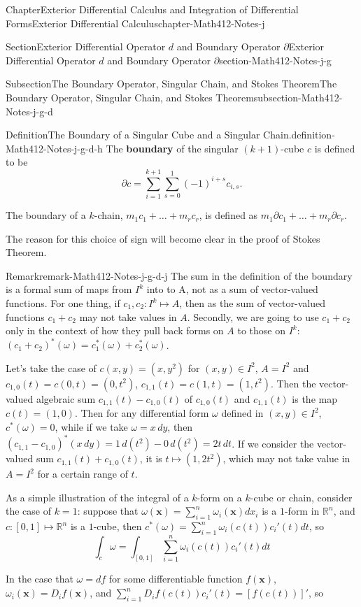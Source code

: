\documentclass[oneside,10pt,]{book}
\newcommand{\terminology}[1]{\textbf{#1}}
\numberwithin{equation}{section}
\newcommand{\bx}{\mathbf{x}}
\newcommand{\bbR}{\mathbb{R}}
\begin{document}
\begin{chapterptx}{Chapter}{Exterior Differential Calculus and Integration of Differential Forms}{}{Exterior Differential Calculus}{}{}{chapter-Math412-Notes-j}
\begin{sectionptx}{Section}{Exterior Differential Operator \(d\) and Boundary Operator \(\partial\)}{}{Exterior Differential Operator \(d\) and Boundary Operator \(\partial\)}{}{}{section-Math412-Notes-j-g}
\begin{subsectionptx}{Subsection}{The Boundary Operator, Singular Chain, and Stokes Theorem}{}{The Boundary Operator, Singular Chain, and Stokes Theorem}{}{}{subsection-Math412-Notes-j-g-d}
\begin{definition}{Definition}{The Boundary of a Singular Cube and a Singular Chain.}{definition-Math412-Notes-j-g-d-h}
The \terminology{boundary} of the singular \((k+1)\)-cube  \(c\) is defined to be%
\begin{equation*}
\partial c=\sum_{i=1}^{k+1}\sum_{s=0}^{1}(-1)^{i+s}c_{i, s}\text{.}
\end{equation*}
%
\par
The boundary of a \(k\)-chain, \(m_{1}c_{1}+\ldots+m_{r} c_{r}\), is defined as \(m_{1}\partial c_{1}+\ldots+m_{r} \partial c_{r}\).%
\end{definition}
The reason for this choice of sign will become clear in the proof of Stokes Theorem.%
\begin{remark}{Remark}{}{remark-Math412-Notes-j-g-d-j}%
The sum in the definition of the boundary is a formal sum of maps from \(I^{k}\) into to A, not as a sum of vector-valued functions.  For one thing, if \(c_{1}, c_{2}:I^{k}\mapsto A\), then as the sum of vector-valued functions \(c_{1}+c_{2}\) may not take values in \(A\). Secondly, we are going to use \(c_{1}+c_{2}\) only in the context of how they pull back forms on \(A\) to those on \(I^{k}\): \((c_{1}+c_{2})^{*}(\omega)=c_{1}^{*}(\omega)+c_{2}^{*}(\omega)\).%
\par
Let's take the case of \(c(x, y)=(x, y^{2})\) for \((x, y)\in I^{2}\), \(A=I^{2}\) and \(c_{1,0}(t)=c(0, t)=(0, t^{2})\), \(c_{1, 1}(t)=c(1, t)=(1, t^{2})\). Then the vector-valued algebraic sum \(c_{1, 1}(t)-c_{1, 0}(t)\) of \(c_{1,0}(t)\) and \(c_{1, 1}(t)\) is the map \(c(t)=(1, 0)\). Then for any differential form \(\omega\) defined in \((x, y)\in I^{2}\), \(c^{*}(\omega)=0\), while if we  take \(\omega=x\, dy\), then \((c_{1, 1}-c_{1, 0})^{*}(x\, dy)=1\, d(t^{2})- 0 \, d(t^{2})=2t\, dt\). If we consider the vector-valued sum \(c_{1, 1}(t)+c_{1, 0}(t)\), it is \(t\mapsto (1, 2 t^{2})\), which may not take value in \(A=I^{2}\) for a certain range of \(t\).%
\end{remark}
As a simple illustration of the integral of a \(k\)-form on a \(k\)-cube or chain, consider the case of \(k=1\): suppose that \(\omega(\bx)=\sum_{i=1}^{n}\omega_{i}(\bx)dx_{i}\) is a \(1\)-form in \(\bbR^{n}\), and \(c:[0, 1]\mapsto \bbR^{n}\) is a \(1\)-cube, then \(c^{*}(\omega)=\sum_{i=1}^{n}\omega_{i}(c(t))c_{i}'(t)dt\), so%
\begin{equation*}
\int_{c} \omega =\int_{[0, 1]} \sum_{i=1}^{n}\omega_{i}(c(t))c_{i}'(t)dt
\end{equation*}
%
\par
In the case that \(\omega=df\) for some differentiable function \(f(\bx)\), \(\omega_{i}(\bx)=D_{i}f(\bx)\), and \(\sum_{i=1}^{n} D_{i}f(c(t))c_{i}'(t) =[f(c(t))]'\), so%

\end{subsectionptx}
\end{sectionptx}
\end{chapterptx}
\end{document}
